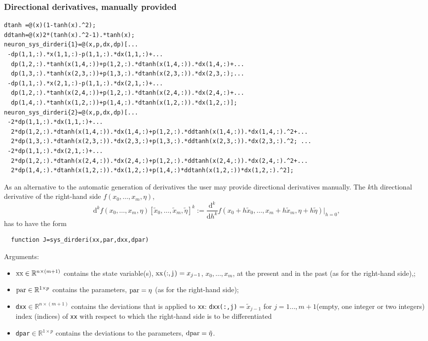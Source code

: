\documentclass[10pt]{scrartcl}
\renewcommand{\d}{\mathrm{d}}
\newcommand{\RR}{\mathbb{R}}
\newcommand{\blist}[1]{\mbox{\lstinline!#1!}}
\begin{document}
\subsubsection{Directional derivatives, manually provided}
\label{sec:dirderi}
\begin{lstlisting}[float,floatplacement=t,frame=lines,label=neuron_sys_dirderi,caption={First two directional derivatives of right-hand side of \cref{example_sys} (vectorized, see \url{../demos/neuron/html/demo1_funcs.html} and note that
 provision of this pair of functions is less complex than the routine
 for \blist{neuron_sys_deri} required in previous versions.)}]
dtanh =@(x)(1-tanh(x).^2);
ddtanh=@(x)2*(tanh(x).^2-1).*tanh(x);
neuron_sys_dirderi{1}=@(x,p,dx,dp)[...
 -dp(1,1,:).*x(1,1,:)-p(1,1,:).*dx(1,1,:)+...
  dp(1,2,:).*tanh(x(1,4,:))+p(1,2,:).*dtanh(x(1,4,:)).*dx(1,4,:)+...
  dp(1,3,:).*tanh(x(2,3,:))+p(1,3,:).*dtanh(x(2,3,:)).*dx(2,3,:);...
 -dp(1,1,:).*x(2,1,:)-p(1,1,:).*dx(2,1,:)+...
  dp(1,2,:).*tanh(x(2,4,:))+p(1,2,:).*dtanh(x(2,4,:)).*dx(2,4,:)+...
  dp(1,4,:).*tanh(x(1,2,:))+p(1,4,:).*dtanh(x(1,2,:)).*dx(1,2,:)];
neuron_sys_dirderi{2}=@(x,p,dx,dp)[...
 -2*dp(1,1,:).*dx(1,1,:)+...
  2*dp(1,2,:).*dtanh(x(1,4,:)).*dx(1,4,:)+p(1,2,:).*ddtanh(x(1,4,:)).*dx(1,4,:).^2+...
  2*dp(1,3,:).*dtanh(x(2,3,:)).*dx(2,3,:)+p(1,3,:).*ddtanh(x(2,3,:)).*dx(2,3,:).^2; ...
 -2*dp(1,1,:).*dx(2,1,:)+...
  2*dp(1,2,:).*dtanh(x(2,4,:)).*dx(2,4,:)+p(1,2,:).*ddtanh(x(2,4,:)).*dx(2,4,:).^2+...
  2*dp(1,4,:).*dtanh(x(1,2,:)).*dx(1,2,:)+p(1,4,:)*ddtanh(x(1,2,:))*dx(1,2,:).^2];
 \end{lstlisting}
As an alternative to the automatic generation of derivatives the user may
provide directional derivatives manually. The $k$th directional derivative of
the right-hand side $f(x_0,\ldots,x_m,\eta)$,
\begin{displaymath}
  \d^kf(x_0,\ldots,x_m,\eta)[\tilde{x}_0,\ldots,\tilde{x}_m,\tilde{\eta}]^k:=
  \frac{\d^k}{\d h^k}f(x_0+h\tilde{x}_0,\ldots,x_m+h\tilde{x}_m,\eta+h\tilde{\eta})\vert_{h=0}\mbox{,}
\end{displaymath}
 has to have the form
\begin{lstlisting}
  function J=sys_dirderi(xx,par,dxx,dpar)
\end{lstlisting}
Arguments:
\begin{itemize}
\item $\blist{xx}\in\RR^{n\times (m+1)}$ contains the state
  variable(s), $\blist{xx(:,j)}=x_{j-1}$, $x_0,\ldots,x_m$, at the present and in the past (as
  for the right-hand side),;
\item $\blist{par}\in\RR^{1\times
  p}$ contains the parameters, $\blist{par}=\eta$  (as for the right-hand side);
\item \blist{dxx}$\in\RR^{n\times(m+1)}$ contains the deviations that is applied to
  \blist{xx}: \blist{dxx(:,j)}$=\tilde{x}_{j-1}$ for
    $j=1\ldots,m+1$(empty, one integer or two integers) index
    (indices) of \blist{xx} with respect to which the right-hand side
    is to be differentiated
\item \blist{dpar}$\in\RR^{1\times
  p}$ contains the deviations to the parameters, $\blist{dpar}=\tilde{\eta}$.
\end{itemize}
\end{document}
